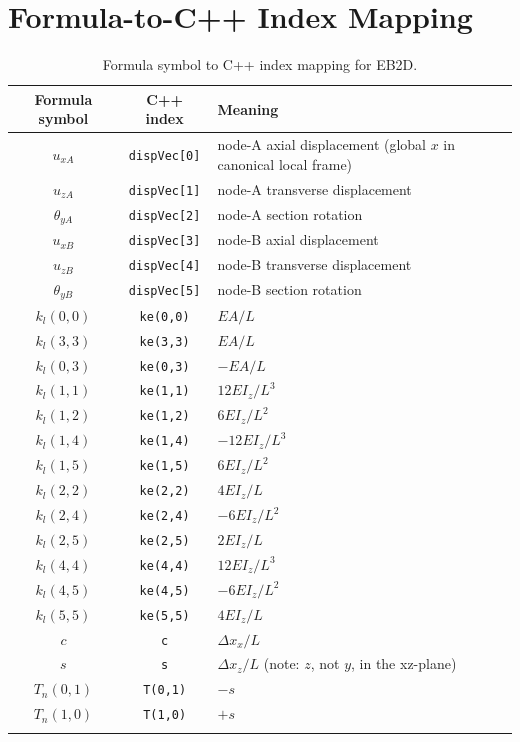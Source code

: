 \documentclass[11pt,a4paper]{article}
\begin{document}
\section{Formula-to-C++ Index Mapping}

\begin{longtable}{c c l}
\toprule
Formula symbol & C++ index & Meaning \\
\midrule
\endhead
$u_{xA}$ & \texttt{dispVec[0]} & node-A axial displacement (global $x$ in canonical local frame) \\
$u_{zA}$ & \texttt{dispVec[1]} & node-A transverse displacement \\
$\theta_{yA}$ & \texttt{dispVec[2]} & node-A section rotation \\
$u_{xB}$ & \texttt{dispVec[3]} & node-B axial displacement \\
$u_{zB}$ & \texttt{dispVec[4]} & node-B transverse displacement \\
$\theta_{yB}$ & \texttt{dispVec[5]} & node-B section rotation \\
\midrule
$k_l(0,0)$ & \texttt{ke(0,0)} & $EA/L$ \\
$k_l(3,3)$ & \texttt{ke(3,3)} & $EA/L$ \\
$k_l(0,3)$ & \texttt{ke(0,3)} & $-EA/L$ \\
$k_l(1,1)$ & \texttt{ke(1,1)} & $12 E I_z / L^3$ \\
$k_l(1,2)$ & \texttt{ke(1,2)} & $6 E I_z / L^2$ \\
$k_l(1,4)$ & \texttt{ke(1,4)} & $-12 E I_z / L^3$ \\
$k_l(1,5)$ & \texttt{ke(1,5)} & $6 E I_z / L^2$ \\
$k_l(2,2)$ & \texttt{ke(2,2)} & $4 E I_z / L$ \\
$k_l(2,4)$ & \texttt{ke(2,4)} & $-6 E I_z / L^2$ \\
$k_l(2,5)$ & \texttt{ke(2,5)} & $2 E I_z / L$ \\
$k_l(4,4)$ & \texttt{ke(4,4)} & $12 E I_z / L^3$ \\
$k_l(4,5)$ & \texttt{ke(4,5)} & $-6 E I_z / L^2$ \\
$k_l(5,5)$ & \texttt{ke(5,5)} & $4 E I_z / L$ \\
\midrule
$c$ & \texttt{c} & $\Delta x_x / L$ \\
$s$ & \texttt{s} & $\Delta x_z / L$ (note: $z$, not $y$, in the xz-plane) \\
$T_n(0,1)$ & \texttt{T(0,1)} & $-s$ \\
$T_n(1,0)$ & \texttt{T(1,0)} & $+s$ \\
\bottomrule
\caption{Formula symbol to C++ index mapping for EB2D.}
\end{longtable}
\end{document}
